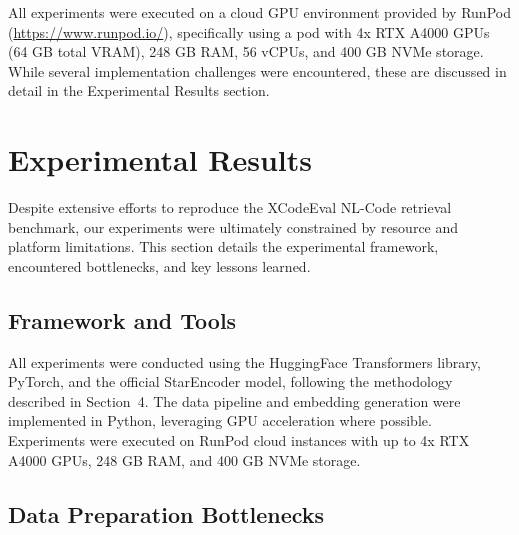 \documentclass[12pt]{article}
\begin{document}
All experiments were executed on a cloud GPU environment provided by RunPod (\url{https://www.runpod.io/}), specifically using a pod with 4x RTX A4000 GPUs (64 GB total VRAM), 248 GB RAM, 56 vCPUs, and 400 GB NVMe storage. While several implementation challenges were encountered, these are discussed in detail in the Experimental Results section.

\section{Experimental Results}








Despite extensive efforts to reproduce the XCodeEval NL-Code retrieval benchmark, our experiments were ultimately constrained by resource and platform limitations. This section details the experimental framework, encountered bottlenecks, and key lessons learned.

\subsection{Framework and Tools}

All experiments were conducted using the HuggingFace Transformers library, PyTorch, and the official StarEncoder model, following the methodology described in Section~4. The data pipeline and embedding generation were implemented in Python, leveraging GPU acceleration where possible. Experiments were executed on RunPod cloud instances with up to 4x RTX A4000 GPUs, 248 GB RAM, and 400 GB NVMe storage.

\subsection{Data Preparation Bottlenecks}
\end{document}

